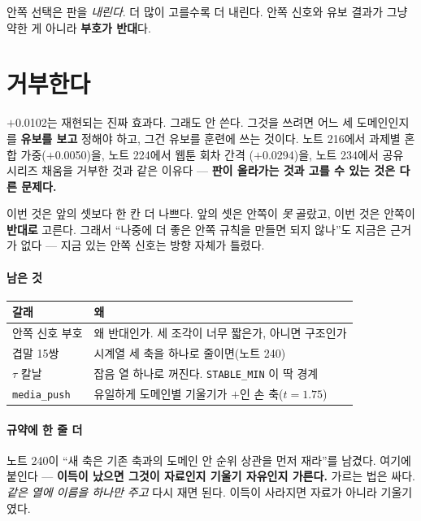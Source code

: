 \documentclass[10pt]{article}
\begin{document}
안쪽 선택은 판을 \emph{내린다}. 더 많이 고를수록 더 내린다. 안쪽 신호와 유보
결과가 그냥 약한 게 아니라 \textbf{부호가 반대}다.

\section{거부한다}

$+$0.0102는 재현되는 진짜 효과다. 그래도 안 쓴다. 그것을 쓰려면 어느 세
도메인인지를 \textbf{유보를 보고} 정해야 하고, 그건 유보를 훈련에 쓰는 것이다.
노트 216에서 과제별 혼합 가중($+$0.0050)을, 노트 224에서 웹툰 회차 간격
($+$0.0294)을, 노트 234에서 공유 시리즈 채움을 거부한 것과 같은 이유다 ---
\textbf{판이 올라가는 것과 고를 수 있는 것은 다른 문제다.}

이번 것은 앞의 셋보다 한 칸 더 나쁘다. 앞의 셋은 안쪽이 \emph{못} 골랐고,
이번 것은 안쪽이 \textbf{반대로} 고른다. 그래서 ``나중에 더 좋은 안쪽 규칙을
만들면 되지 않나''도 지금은 근거가 없다 --- 지금 있는 안쪽 신호는 방향
자체가 틀렸다.

\paragraph{남은 것}
\begin{center}\small
\begin{tabular}{ll}
\hline
갈래 & 왜 \\
\hline
안쪽 신호 부호 & 왜 반대인가. 세 조각이 너무 짧은가, 아니면 구조인가 \\
겹말 15쌍 & 시계열 세 축을 하나로 줄이면(노트 240) \\
$\tau$ 칼날 & 잡음 열 하나로 꺼진다. \texttt{STABLE\_MIN} 이 딱 경계 \\
\texttt{media\_push} & 유일하게 도메인별 기울기가 $+$인 손 축($t{=}1.75$) \\
\hline
\end{tabular}
\end{center}

\paragraph{규약에 한 줄 더} 노트 240이 ``새 축은 기존 축과의 도메인 안 순위
상관을 먼저 재라''를 남겼다. 여기에 붙인다 --- \textbf{이득이 났으면 그것이
자료인지 기울기 자유인지 가른다.} 가르는 법은 싸다. \emph{같은 열에 이름을
하나만 주고} 다시 재면 된다. 이득이 사라지면 자료가 아니라 기울기였다.
\end{document}
